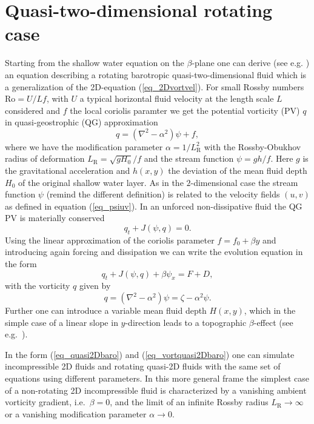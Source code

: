 \section{Quasi-two-dimensional rotating case} \label{sec_quasi2Dcase}
%
Starting from the shallow water equation on the $\beta$-plane one can
derive (see e.g. \cite{danilovandgurarie2000}) an equation
describing a rotating barotropic quasi-two-dimensional fluid which is a
generalization of the 2D-equation (\ref{eq_2Dvortvel}). For small Rossby 
numbers $\mathrm{Ro} = U/Lf$, with $U$ a typical horizontal fluid velocity
at the length scale $L$ considered and $f$ the local coriolis paramter 
we get the potential vorticity (PV) $q$ in quasi-geostrophic (QG) approximation 
\begin{equation} \label{eq_qdef}
  q = \left( \nabla^{2}- \alpha^{2} \right) \psi + f,
\end{equation}
where we have the modification parameter $\alpha = 1/L^{2}_{\mathrm{R}}$ 
with the Rossby-Obukhov radius of deformation 
$L_{\mathrm{R}} = \sqrt{g H_{0}}/f$ and the stream function 
$\psi = gh/f$. Here $g$ is the gravitational acceleration and $h(x,y)$ 
the deviation of the mean fluid depth $H_{0}$ of the original 
shallow water layer. As in the $2$-dimensional case the stream function $\psi$ 
(remind the different definition) is related to the velocity fields $(u,v)$ 
as defined in equation (\ref{eq_psiuv}). In an unforced non-dissipative fluid
the QG PV is materially conserved
\begin{equation} 
  q_{t} + J(\psi,q) = 0. 
\end{equation}  
Using the linear approximation of the coriolis parameter $f = f_{0} + \beta y$
and introducing again forcing and dissipation we can write the evolution
equation in the form
\begin{equation} \label{eq_quasi2Dbaro}
  q_{t} + J(\psi,q) + \beta \psi_{x} = F + D,
\end{equation}
with the vorticity $q$ given by
\begin{equation} \label{eq_vortquasi2Dbaro}
  q = \left(\nabla^2 -\alpha^{2} \right) \psi 
    = \zeta - \alpha^{2} \psi.
\end{equation}
Further one can introduce a variable mean fluid depth $H(x,y)$, 
which in the simple case of a linear slope in $y$-direction leads 
to a topographic $\beta$-effect (see e.g.\ \cite{vanheist1994}). 

In the form (\ref{eq_quasi2Dbaro}) and (\ref{eq_vortquasi2Dbaro}) 
one can simulate incompressible 2D fluids and rotating quasi-2D fluids 
with the same set of equations using different parameters. 
In this more general frame the simplest case of a non-rotating
2D incompressible fluid is characterized by a vanishing 
ambient vorticity gradient, i.e.\ $\beta = 0$, and the limit of
an infinite Rossby radius $L_{\mathrm{R}} \longrightarrow \infty$
or a vanishing modification parameter $\alpha \longrightarrow 0$.

